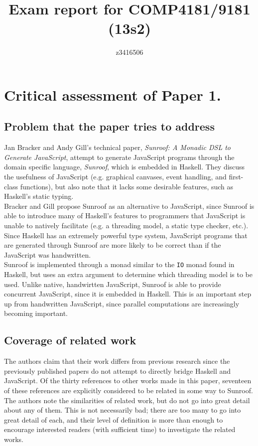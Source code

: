 \documentclass[9pt, twocolumn]{article}
\title{Exam report for COMP4181/9181 (13s2)}
\author{z3416506}
\date{}
\begin{document}
\maketitle
\clearpage

\section*{Critical assessment of Paper 1.}
\subsection*{Problem that the paper tries to address}
Jan Bracker and Andy Gill's technical paper, {\it Sunroof: A Monadic DSL to Generate JavaScript}, attempt to generate JavaScript programs through the domain specific language, {\it Sunroof}, which is embedded in Haskell.
They discuss the usefulness of JavaScript (e.g. graphical canvases, event handling, and first-class functions), but also note that it lacks some desirable features, such as Haskell's static typing.\\

Bracker and Gill propose Sunroof as an alternative to JavaScript, since Sunroof is able to introduce many of Haskell's features to programmers that JavaScript is unable to natively facilitate (e.g. a threading model, a static type checker, etc.).
Since Haskell has an extremely powerful type system, JavaScript programs that are generated through Sunroof are more likely to be correct than if the JavaScript was handwritten.\\

Sunroof is implemented through a monad similar to the \verb/IO/ monad found in Haskell, but uses an extra argument to determine which threading model is to be used.
Unlike native, handwirtten JavaScript, Sunroof is able to provide concurrent JavaScript, since it is embedded in Haskell.
This is an important step up from handwritten JavaScript, since parallel computations are increasingly becoming important.

\subsection*{Coverage of related work}
The authors claim that their work differs from previous research since the previously published papers do not attempt to directly bridge Haskell and JavaScript.
Of the thirty references to other works made in this paper, seventeen of these references are explicitly considered to be related in some way to Sunroof.
The authors note the similarities of related work, but do not go into great detail about any of them.
This is not necessarily bad; there are too many to go into great detail of each, and their level of definition is more than enough to encourage interested readers (with sufficient time) to investigate the related works.\\
\end{document}
